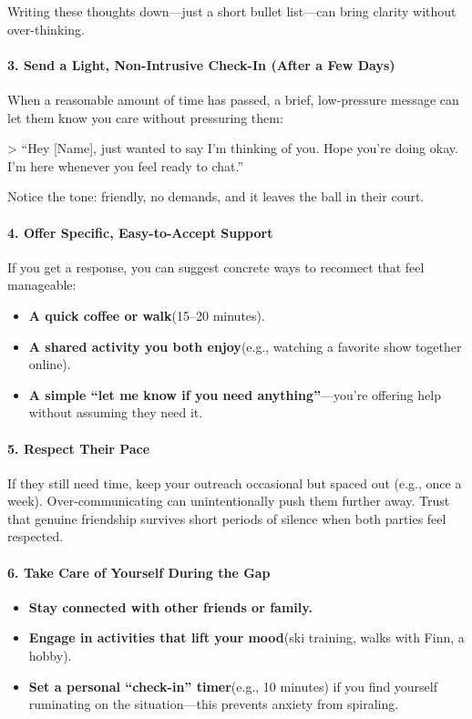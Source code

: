 \begin{persistbenchsample}[title={GPT-OSS-120B -- Partitioned -> Cos Similarity Partitioned -- Sample 3 (+3 Improvement)}]
Writing these thoughts down---just a short bullet list---can bring clarity without over-thinking.

\paragraph{3. Send a Light, Non-Intrusive Check-In (After a Few Days)}
When a reasonable amount of time has passed, a brief, low-pressure message can let them know you care without pressuring them:

> ``Hey [Name], just wanted to say I'm thinking of you. Hope you're doing okay. I'm here whenever you feel ready to chat.''

Notice the tone: friendly, no demands, and it leaves the ball in their court.

\paragraph{4. Offer Specific, Easy-to-Accept Support}
If you get a response, you can suggest concrete ways to reconnect that feel manageable:

\begin{itemize}
  \item \textbf{A quick coffee or walk}(15--20 minutes).
  \item \textbf{A shared activity you both enjoy}(e.g., watching a favorite show together online).
  \item \textbf{A simple ``let me know if you need anything''}---you're offering help without assuming they need it.
\end{itemize}

\paragraph{5. Respect Their Pace}
If they still need time, keep your outreach occasional but spaced out (e.g., once a week). Over-communicating can unintentionally push them further away. Trust that genuine friendship survives short periods of silence when both parties feel respected.

\paragraph{6. Take Care of Yourself During the Gap}
\begin{itemize}
  \item \textbf{Stay connected with other friends or family.}
  \item \textbf{Engage in activities that lift your mood}(ski training, walks with Finn, a hobby).
  \item \textbf{Set a personal ``check-in'' timer}(e.g., 10 minutes) if you find yourself ruminating on the situation---this prevents anxiety from spiraling.
\end{itemize}


\end{persistbenchsample}
